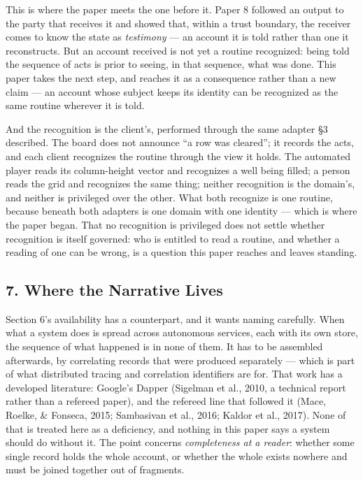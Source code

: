 \documentclass[
]{article}
\newcounter{none} %
\begin{document}
This is where the paper meets the one before it. Paper 8 followed an
output to the party that receives it and showed that, within a trust
boundary, the receiver comes to know the state as \emph{testimony} ---
an account it is told rather than one it reconstructs. But an account
received is not yet a routine recognized: being told the sequence of
acts is prior to seeing, in that sequence, what was done. This paper
takes the next step, and reaches it as a consequence rather than a new
claim --- an account whose subject keeps its identity can be recognized
as the same routine wherever it is told.

And the recognition is the client's, performed through the same adapter
§3 described. The board does not announce ``a row was cleared''; it
records the acts, and each client recognizes the routine through the
view it holds. The automated player reads its column-height vector and
recognizes a well being filled; a person reads the grid and recognizes
the same thing; neither recognition is the domain's, and neither is
privileged over the other. What both recognize is one routine, because
beneath both adapters is one domain with one identity --- which is where
the paper began. That no recognition is privileged does not settle
whether recognition is itself governed: who is entitled to read a
routine, and whether a reading of one can be wrong, is a question this
paper reaches and leaves standing.

\subsection{7. Where the Narrative
Lives}\label{where-the-narrative-lives}

Section 6's availability has a counterpart, and it wants naming
carefully. When what a system does is spread across autonomous services,
each with its own store, the sequence of what happened is in none of
them. It has to be assembled afterwards, by correlating records that
were produced separately --- which is part of what distributed tracing
and correlation identifiers are for. That work has a developed
literature: Google's Dapper (Sigelman et al., 2010, a technical report
rather than a refereed paper), and the refereed line that followed it
(Mace, Roelke, \& Fonseca, 2015; Sambasivan et al., 2016; Kaldor et al.,
2017). None of that is treated here as a deficiency, and nothing in this
paper says a system should do without it. The point concerns
\emph{completeness at a reader}: whether some single record holds the
whole account, or whether the whole exists nowhere and must be joined
together out of fragments.
\end{document}
